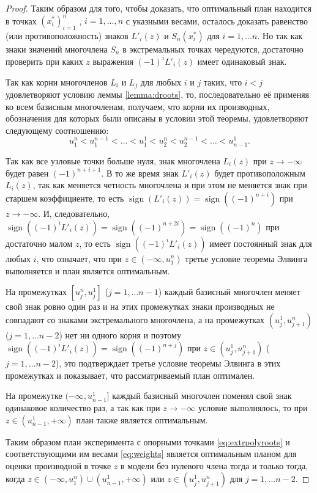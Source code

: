 \documentclass[specialist,
               substylefile = spbu.rtx,
               subf,href,colorlinks=true, 12pt]{disser}
\theoremstyle{definition}
\DeclareMathOperator*{\sign}{sign}
\begin{document}
\begin{proof}
	Таким образом для того, чтобы доказать, что оптимальный план находится в точках $(x_i^*)_{i=1}^n$ , $i = 1, \ldots, n$ с указными весами, осталось доказать равенство (или противоположность) знаков $L'_i(z)$ и $ S_n(x_i^*)$ для $i = 1, \ldots n$. Но так как знаки значений многочлена $S_n$ в экстремальных точках чередуются, достаточно проверить при каких $z$ выражения $(-1)^i L'_i(z)$ имеет одинаковый знак.
	
	Так как корни многочленов $L_i$ и $L_j$ для любых $i$ и $j$ таких, что $i < j$ удовлетворяют условию леммы \ref{lemma:droots}, то, последовательно её применяя ко всем базисным многочленам, получаем, что корни их производных, обозначения для которых были описаны в условии этой теоремы, удовлетворяют следующему соотношению:
	\begin{equation*}
		u^n_1 < u^{n-1}_1 < \ldots < u^1_1 < u^n_2 < u^{n-1}_2 < \ldots < u_{n-1}^1.
	\end{equation*}
	
	Так как все узловые точки больше нуля, знак многочлена $L_i(z)$ при $z \to -\infty$ будет равен $(-1)^{n+i+1}$. В то же время знак $L'_i(z)$ будет противоположным $L_i(z)$, так как меняется четность многочлена и при этом не меняется знак при старшем коэффициенте, то есть $\sign(L'_i(z)) = \sign((-1)^{n+i})$ при $z \to -\infty$. И, следовательно, $\sign((-1)^i L'_i(z)) = \sign((-1)^{n+2i}) = \sign((-1)^{n})$ при достаточно малом  $z $, то есть $\sign((-1)^i L'_i(z))$  имеет постоянный знак для любых $i$, что означает, что при $z \in (-\infty, u_1^n)$ третье условие теоремы Элвинга выполняется и план является оптимальным.
	
	На промежутках $[u_j^n, u_j^1]$ ($j = 1, \ldots {n-1}$) каждый базисный многочлен меняет свой знак ровно один раз и на этих промежутках знаки производных не совпадают со знаками экстремального многочлена, а на промежутках $(u_j^1, u_{j+1}^n)$ ($j=1, \ldots n-2$) нет ни одного корня и поэтому $\sign((-1)^i L'_i(z)) = \sign ((-1)^{n + j})$ при $z \in (u_j^1, u_{j+1}^n)$ ($j=1, \ldots n-2$), это подтверждает третье условие теоремы Элвинга в этих промежутках и показывает, что рассматриваемый план оптимален.
	
	На промежутке $(-\infty, u_{n-1}^1]$ каждый базисный многочлен поменял свой знак одинаковое количество раз, а так как при $z \to -\infty$ условие выполнялось, то при $z \in (u_{n-1}^1, +\infty)$ план также является оптимальным.
	
	Таким образом план эксперимента с опорными точками \eqref{eq:extrpolyroots} и соответствующими им весами \eqref{eq:weights} является оптимальным планом для оценки производной в точке $z$ в модели без нулевого члена тогда и только тогда, когда $z \in  (-\infty, u_1^n) \cup (u_{n-1}^1, +\infty)$ или $z \in (u_{j}^1, u_{j+1}^n)$ для $j=1, \ldots n-2$.

	\end{proof}
	
\end{document}

